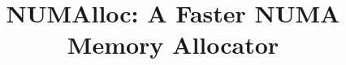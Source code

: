 \documentclass[pageno]{jpaper}
\newcommand{\todo}[1]{{\color{red}\bfseries [[#1]]}}
\begin{document}
\title{NUMAlloc: A Faster NUMA Memory Allocator} 

\date{}
\maketitle

\thispagestyle{empty}

\begin{abstract}

\end{abstract}


\thispagestyle{plain}
\pagestyle{plain}












\end{document}
